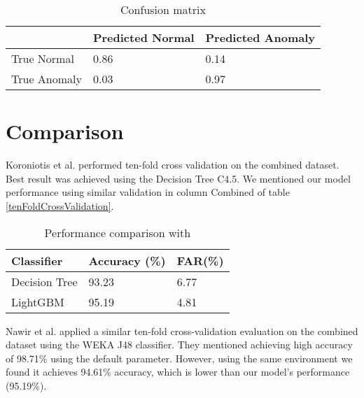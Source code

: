 \documentclass[14pt, conference]{IEEEtran}
\begin{document}
\begin{table}[H]
\normalsize
\centering
\caption{Confusion matrix}
\label{confusionMatrix}
\renewcommand{\arraystretch}{1.2}
\begin{tabular}{|C{2.2cm}|C{2.3cm}|C{2.3cm}|}
\hline
 & Predicted Normal & Predicted Anomaly \\ \hline
True Normal & 0.86 & 0.14 \\ \hline
True Anomaly & 0.03 & 0.97\\ \hline
\end{tabular}
\end{table}


\section{Comparison \label{comparison}}
Koroniotis et al. \cite{koroniotis2017towards} performed ten-fold cross validation on the combined dataset. Best result was achieved using the Decision Tree C4.5. We mentioned our model performance using similar validation in column Combined of table \ref{tenFoldCrossValidation}.

\begin{table}[H]
\normalsize
\centering
\caption{Performance comparison with \cite{koroniotis2017towards}}
\label{performanceComparisonWithKoroniotis}
\renewcommand{\arraystretch}{1.2}

\begin{tabular}{|C{3.3cm}|C{2.2cm}|C{1.5cm}|}
\hline
\textbf{Classifier} & \textbf{Accuracy (\%)} & \textbf{FAR(\%)} \\ \hline
Decision Tree \cite{koroniotis2017towards} & 93.23 & 6.77 \\ \hline
LightGBM & 95.19 & 4.81 \\ \hline
\end{tabular}
\end{table}

Nawir et al. \cite{nawir2019effective} applied a similar ten-fold cross-validation evaluation on the combined dataset using the WEKA J48 classifier. They mentioned achieving high accuracy of 98.71\% using the default parameter. However, using the same environment we found it achieves 94.61\% accuracy, which is lower than our model's performance (95.19\%).
\end{document}
